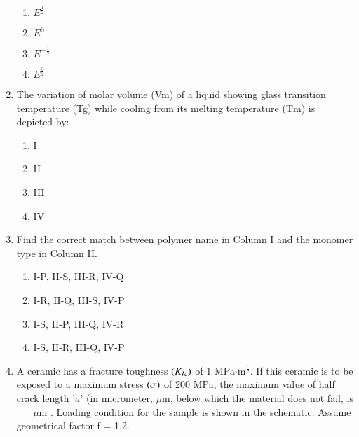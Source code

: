 \documentclass[journal]{IEEEtran}
\begin{document}
\begin{enumerate}
\begin{enumerate}
    \item $E^{\frac{1}{2}}$
    \item $E^0$
    \item $E^{-\frac{1}{2}}$
    \item $E^{\frac{3}{2}}$ \\
\end{enumerate}
\item The variation of molar volume (Vm) of a liquid showing glass transition temperature (Tg) while cooling from its melting temperature (Tm) is depicted by:
\pagebreak
\begin{figure}[!ht]
\centering
\resizebox{0.7\textwidth}{!}{%

}%
\end{figure}
\begin{enumerate}
    \item I
    \item II
    \item III
    \item IV \\
\end{enumerate}
\item Find the correct match between polymer name in Column I and the monomer type in Column II.
\begin{table}[h!]
  \centering
  
\end{table}
\begin{enumerate}
    \item I-P, II-S, III-R, IV-Q
    \item I-R, II-Q, III-S, IV-P
    \item I-S, II-P, III-Q, IV-R
    \item I-S, II-R, III-Q, IV-P \\
\end{enumerate}
\item A ceramic has a fracture toughness $\left(K_{Ic}\right)$ of 1 MPa$\cdot\text{m}^\frac{1}{2}$. If this ceramic is to be exposed to a maximum stress $\left(\sigma\right)$ of 200 MPa, the maximum value of half crack length '$a$' (in micrometer, $\mu$m, below which the material does not fail, is $\_\_\_\_$ $\mu$m . Loading condition for the sample is shown in the schematic. Assume geometrical factor f = 1.2. \\
\begin{figure}[!ht]
\centering
\resizebox{0.2\textwidth}{!}{%

}%
\end{figure}

\end{enumerate}
\end{document}
